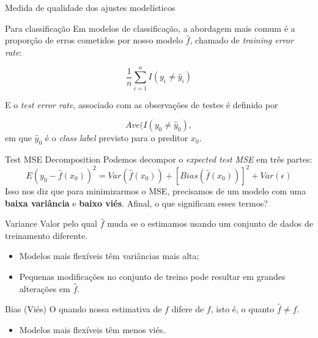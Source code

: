 \documentclass{beamer}
\begin{document}
\begin{frame}{Medida de qualidade dos ajustes modelísticos}
    \begin{block}{Para classificação}
        Em modelos de classificação, a abordagem mais comum é a proporção de erros cometidos por nosso modelo $\hat{f}$, chamado de \textit{training error rate}:
        
        \begin{equation}
            \frac{1}{n} \sum_{i=1}^n I(y_i \neq \hat{y}_i)
        \end{equation}
        
        E o \textit{test error rate}, associado com as observações de testes é definido por
        
        \begin{equation}
            Ave (I(y_0 \neq \hat{y}_0),
        \end{equation}
        em que $\hat{y}_0$ é o \textit{class label} previsto para o preditor $x_0$.
        \vfill
    \end{block}
\end{frame}

\begin{frame}{Test MSE Decomposition}
Podemos decompor o \textit{expected test MSE} em três partes:
\begin{equation}
    E(y_0 - \hat{f}(x_0))^2 = Var(\hat{f}(x_0)) + [Bias(\hat{f}(x_0))]^2 + Var(\epsilon)
\end{equation}
Isso nos diz que para minimizarmos o MSE, precisamos de um modelo com uma \textbf{baixa variância} e \textbf{baixo viés}. Afinal, o que significam esses termos?

    \begin{block}{Variance}
        Valor pelo qual $\hat{f}$ muda se o estimamos usando um conjunto de dados de treinamento diferente.
        \begin{itemize}
            \item Modelos mais flexíveis têm variâncias mais alta;
            \item Pequenas modificações no conjunto de treino pode resultar em grandes alterações em $\hat{f}$.
        \end{itemize}
    \end{block}
    
     \begin{block}{Bias (Viés)}
        O quando nossa estimativa de $f$ difere de $f$, isto é, o quanto $\hat{f} \neq f $.
        
        \begin{itemize}
            \item Modelos mais flexíveis têm menos viés.
        \end{itemize}
    \end{block}

\end{frame}
\end{document}
